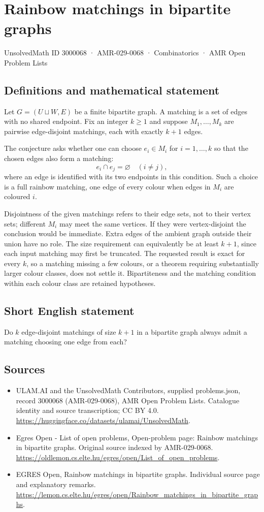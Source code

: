 \documentclass[11pt,a4paper]{article}
\begin{document}
\section*{Rainbow matchings in bipartite graphs}\label{3000068}
{\small UnsolvedMath ID 3000068 · AMR-029-0068 · Combinatorics · AMR Open Problem Lists}
\subsection{Definitions and mathematical statement}
Let $G=(U\sqcup W,E)$ be a finite bipartite graph. A matching is
a set of edges with no shared endpoint. Fix an integer $k\ge1$
and suppose $M_1,\ldots,M_k$ are pairwise edge-disjoint matchings,
each with exactly $k+1$ edges.

The conjecture asks whether one can choose $e_i\in M_i$ for
$i=1,\ldots,k$ so that the chosen edges also form a matching:
\[
                         e_i\cap e_j=\varnothing
                                           \quad(i\ne j),
\]
where an edge is identified with its two endpoints in this condition.
Such a choice is a full rainbow matching, one edge of every colour
when edges in $M_i$ are coloured $i$.

Disjointness of the given matchings refers to their edge sets, not
to their vertex sets; different $M_i$ may meet the same vertices.
If they were vertex-disjoint the conclusion would be immediate.
Extra edges of the ambient graph outside their union have no role.
The size requirement can equivalently be at least $k+1$, since
each input matching may first be truncated. The requested result
is exact for every $k$, so a matching missing a few colours, or a
theorem requiring substantially larger colour classes, does not
settle it. Bipartiteness and the matching condition within each
colour class are retained hypotheses.
\subsection{Short English statement}
Do $k$ edge-disjoint matchings of size $k+1$ in a bipartite graph
always admit a matching choosing one edge from each?
\subsection{Sources}
\begin{itemize}
\item[S1] ULAM.AI and the UnsolvedMath Contributors, supplied problems.json, record 3000068 (AMR-029-0068), AMR Open Problem Lists. Catalogue identity and source transcription; CC BY 4.0.
\url{https://huggingface.co/datasets/ulamai/UnsolvedMath}.
\item[S2] Egres Open - List of open problems, Open-problem page: Rainbow matchings in bipartite graphs. Original source indexed by AMR-029-0068.
\url{https://oldlemon.cs.elte.hu/egres/open/List_of_open_problems}.
\item[S3] EGRES Open, Rainbow matchings in bipartite graphs. Individual source page and explanatory remarks.
\url{https://lemon.cs.elte.hu/egres/open/Rainbow_matchings_in_bipartite_graphs}.
\end{itemize}
\end{document}
